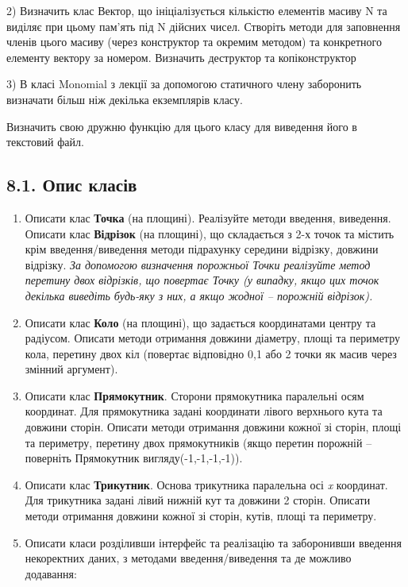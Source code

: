\documentclass[]{article}
\begin{document}
2) Визначить клас Вектор, що ініціалізується кількістю елементів масиву
N та виділяє при цьому пам'ять під N дійсних чисел. Створіть методи для
заповнення членів цього масиву (через конструктор та окремим методом) та
конкретного елементу вектору за номером. Визначить деструктор та
копіконструктор

3) В класі Monomial з лекції за допомогою статичного члену заборонить
визначати більш ніж декілька екземплярів класу.

Визначить свою дружню функцію для цього класу для виведення його в
текстовий файл.

\subsection{8.1. Опис
класів}\label{ux43eux43fux438ux441-ux43aux43bux430ux441ux456ux432}

\begin{enumerate}
\def\labelenumi{\arabic{enumi})}
\item
  Описати клас \textbf{Точка} (на площині). Реалізуйте методи введення,
  виведення. Описати клас \textbf{Відрізок} (на площині), що складається
  з 2-х точок та містить крім введення/виведення методи підрахунку
  середини відрізку, довжини відрізку. \emph{За допомогою визначення
  порожньої Точки реалізуйте метод перетину двох відрізків, що повертає
  Точку (у випадку, якщо цих точок декілька виведіть будь-яку з них, а
  якщо жодної -- порожній відрізок).}
\item
  Описати клас \textbf{Коло} (на площині), що задається координатами
  центру та радіусом. Описати методи отримання довжини діаметру, площі
  та периметру кола, перетину двох кіл (повертає відповідно 0,1 або 2
  точки як масив через змінний аргумент).
\item
  Описати клас \textbf{Прямокутник}. Сторони прямокутника паралельні
  осям координат. Для прямокутника задані координати лівого верхнього
  кута та довжини сторін. Описати методи отримання довжини кожної зі
  сторін, площі та периметру, перетину двох прямокутників (якщо перетин
  порожній -- поверніть Прямокутник вигляду(-1,-1,-1,-1)).
\item
  Описати клас \textbf{Трикутник}. Основа трикутника паралельна осі
  \emph{x} координат. Для трикутника задані лівий нижній кут та довжини
  2 сторін. Описати методи отримання довжини кожної зі сторін, кутів,
  площі та периметру.
\item
  Описати класи розділивши інтерфейс та реалізацію та заборонивши
  введення некоректних даних, з методами введення/виведення та де
  можливо додавання:
\end{enumerate}
\end{document}
